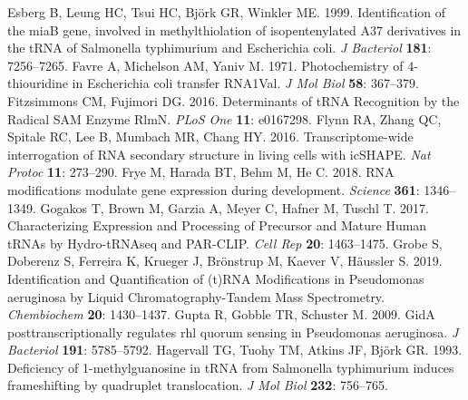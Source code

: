 \documentclass[times, twoside]{zHenriquesLab-StyleBioRxiv}
\begin{document}
Esberg B, Leung HC, Tsui HC, Björk GR, Winkler ME. 1999. Identification of the miaB gene, involved in methylthiolation of isopentenylated A37 derivatives in the tRNA of Salmonella typhimurium and Escherichia coli. \textit{J Bacteriol} \textbf{181}: 7256–7265. 
\newline
\newline
Favre A, Michelson AM, Yaniv M. 1971. Photochemistry of 4-thiouridine in Escherichia coli transfer RNA1Val. \textit{J Mol Biol} \textbf{58}: 367–379. 
\newline
\newline
Fitzsimmons CM, Fujimori DG. 2016. Determinants of tRNA Recognition by the Radical SAM Enzyme RlmN. \textit{PLoS One} \textbf{11}: e0167298. 
\newline
\newline
Flynn RA, Zhang QC, Spitale RC, Lee B, Mumbach MR, Chang HY. 2016. Transcriptome-wide interrogation of RNA secondary structure in living cells with icSHAPE. \textit{Nat Protoc} \textbf{11}: 273–290. 
\newline
\newline
Frye M, Harada BT, Behm M, He C. 2018. RNA modifications modulate gene expression during development. \textit{Science} \textbf{361}: 1346–1349. 
\newline
\newline
Gogakos T, Brown M, Garzia A, Meyer C, Hafner M, Tuschl T. 2017. Characterizing Expression and Processing of Precursor and Mature Human tRNAs by Hydro-tRNAseq and PAR-CLIP. \textit{Cell Rep} \textbf{20}: 1463–1475. 
\newline
\newline
Grobe S, Doberenz S, Ferreira K, Krueger J, Brönstrup M, Kaever V, Häussler S. 2019. Identification and Quantification of (t)RNA Modifications in Pseudomonas aeruginosa by Liquid Chromatography-Tandem Mass Spectrometry. \textit{Chembiochem} \textbf{20}: 1430–1437. 
\newline
\newline
Gupta R, Gobble TR, Schuster M. 2009. GidA posttranscriptionally regulates rhl quorum sensing in Pseudomonas aeruginosa. \textit{J Bacteriol} \textbf{191}: 5785–5792. 
\newline
\newline
Hagervall TG, Tuohy TM, Atkins JF, Björk GR. 1993. Deficiency of 1-methylguanosine in tRNA from Salmonella typhimurium induces frameshifting by quadruplet translocation. \textit{J Mol Biol} \textbf{232}: 756–765. 
\newline
\newline
\end{document}

